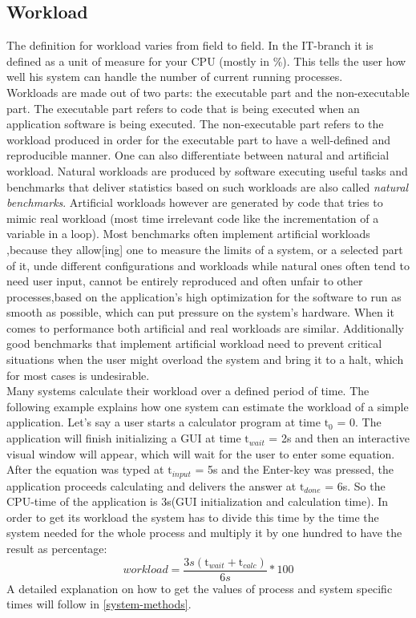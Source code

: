 \subsection{Workload}
The definition for workload varies from field to field. In the IT-branch it is defined as a unit of measure for your CPU (mostly in \%). This tells the user how well his system can handle the number of current running processes.\\
Workloads are made out of two parts: the executable part and the non-executable part. The executable part refers to code that is being executed when an application software is being executed. The non-executable part refers to the workload produced in order for the executable part to have \dq a well-defined and reproducible manner\dq{}. One can also differentiate between natural and artificial workload. Natural workloads are produced by software executing useful tasks and benchmarks that deliver statistics based on such workloads are also called \textit{natural benchmarks}. Artificial workloads however are generated by code that tries to mimic real workload (most time irrelevant code like the incrementation of a variable in a loop). Most benchmarks often implement artificial workloads ,because they \dq allow[ing] one to measure the limits of a system, or a selected part of it, unde different configurations and workloads\dq{} while natural ones often tend to need user input, cannot be entirely reproduced and often unfair to other processes,based on the application's high optimization for the software to run as smooth as possible, which can put pressure on the system's hardware\cite{Kounev2020}. When it comes to performance both artificial and real workloads are similar. Additionally good benchmarks that implement artificial workload need to prevent critical situations when the user might overload the system and bring it to a halt, which for most cases is undesirable.\\
Many systems calculate their workload over a defined period of time. The following example explains how one system can estimate the workload of a simple application. Let's say a user starts a calculator program at time $\mathrm{t}_0$ = 0. The application will finish initializing a GUI at time $\mathrm{t}_{wait}$ = 2s and then an interactive visual window will appear, which will wait for the user to enter some equation.
After the equation was typed at $\mathrm{t}_{input}$ = 5s and the \dq Enter\dq{}-key was pressed, the application proceeds calculating and delivers the answer at $\mathrm{t}_{done}$ = 6s. So the CPU-time of the application is 3s(GUI initialization and calculation time). In order to get its workload the system has to divide this time by the time the system needed for the whole process and multiply it by one hundred to have the result as percentage:\\
\begin{equation}
workload =  \frac{3s(\mathrm{t}_{wait}+\mathrm{t}_{calc})}{6s}*100\end{equation}
A detailed explanation on how to get the values of process and system specific times will follow in \ref{system-methods}.
